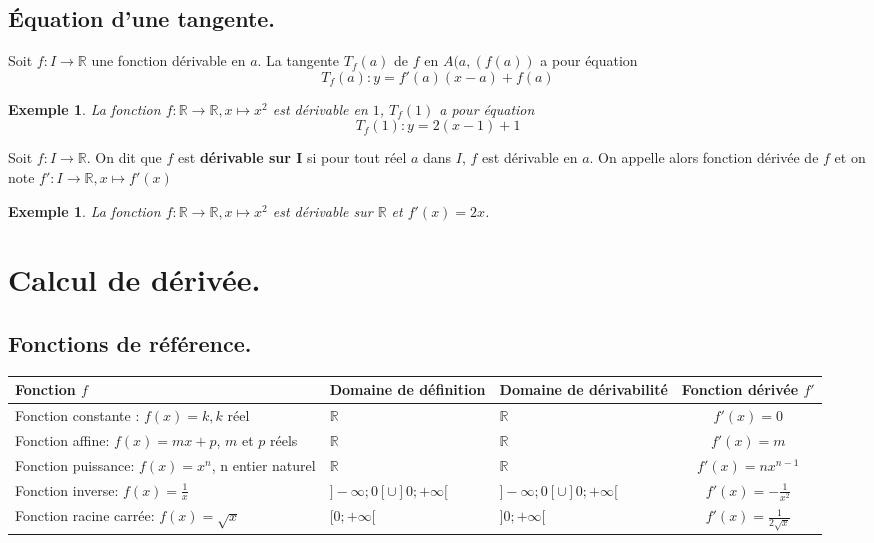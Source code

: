\documentclass[a4paper,11pt]{article}
\newcommand{\R}{\mathbb{R}}
\theoremstyle{break}
\newcounter{enonce}
\newtheorem{exemple}[enonce]{Exemple}
\begin{document}
    \subsection{\'Equation d'une tangente.}
  
   \begin{theorem}
      Soit $f:I \to \R$ une fonction dérivable en $a$. La tangente $T_f(a)$ de $f$ en $A(a,(f(a))$ a
      pour équation $$T_f(a):y=f'(a)(x-a)+f(a)$$
   \end{theorem}
   
    \begin{exemple}
  
  La fonction $f:\R \to \R, x \mapsto x^2$ est dérivable en $1$, $T_f(1)$ a pour équation
  $$T_f(1):y=2(x-1)+1$$
  
   \end{exemple}
  
  
  \begin{definition} 
    
   Soit $f:I \to \R$. On dit que $f$ est \textbf{dérivable sur $\mathbf{I}$} si pour tout réel $a$ dans $I$,
   $f$ est dérivable en $a$. On appelle alors fonction dérivée de $f$ et on note 
   $f':I \to \R, x \mapsto f'(x)$ 
   \end{definition}
   
   \begin{exemple}
    
  La fonction $f:\R \to \R, x \mapsto x^2$ est dérivable sur $\R$ et $f'(x)=2 x$.  
    
   \end{exemple}
   
   \section{Calcul de dérivée.}
   
    \subsection{Fonctions de référence.}
    
    \begin{tabular}{|l|p{2.7cm}|p{3cm}|c|}\hline
     Fonction $f$ & Domaine de définition & Domaine de dérivabilité & Fonction dérivée $f'$ \\ \hline
     Fonction constante : $f(x)=k, k$ réel&  $\R$ & $\R$ & $f'(x)=0$ \\ \hline
     Fonction affine: $f(x)=mx+p$, $m$ et $p$ réels & $\R$ & $\R$ & $f'(x)=m$ \\ \hline
     Fonction puissance: $f(x)=x^n$, n entier naturel & $\R$ & $\R$ & $f'(x)=nx^{n-1}$ \\ \hline
     Fonction inverse: $f(x)=\frac{1}{x}$ & $]-\infty;0[ \cup ]0;+\infty [$ & $]-\infty;0[ \cup ]0;+\infty [$ & $f'(x)=-\frac{1}{x^2}$ \\ \hline
     Fonction racine carrée: $f(x)=\sqrt{x}$& $[0;+\infty[$ & $]0;+\infty[$ & $f'(x)=\frac{1}{2\sqrt{x}}$ \\ \hline
    \end{tabular}
    
\end{document}
